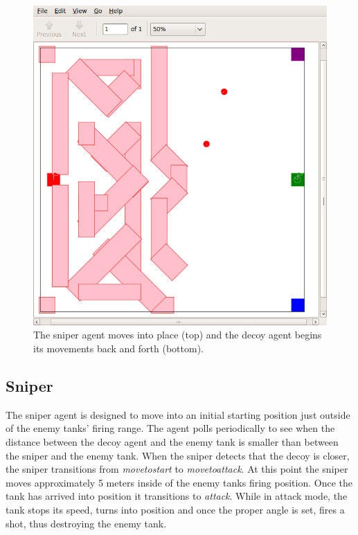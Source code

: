 \begin{figure}\label{fig:decoy}
\begin{center}
\includegraphics[width=\textwidth]{04decoy.png}
\caption{The sniper agent moves into place (top) and the decoy agent begins its movements back and forth (bottom).}
\end{center}
\end{figure}

\subsection{Sniper}

The sniper agent is designed to move into an initial starting position just outside of the enemy tanks' firing range.  The agent polls periodically to see when the distance between the decoy agent and the enemy tank is smaller than between the sniper and the enemy tank.  When the sniper detects that the decoy is closer, the sniper transitions from \emph{move\textunderscore to\textunderscore start} to \emph{move\textunderscore to\textunderscore attack}.  At this point the sniper moves approximately 5 meters inside of the enemy tanks firing position.  Once the tank has arrived into position it transitions to \emph{attack}.  While in attack mode, the tank stops its speed, turns into position and once the proper angle is set, fires a shot, thus destroying the enemy tank.

